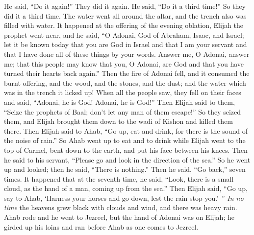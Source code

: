 \begin{biblechapter}
\verse He said, “Do it again!” They did it again. He said, “Do it a third time!” So they did it a third time.
\verse The water went all around the altar, and the trench also was filled with water.
\verse It happened at the offering of the evening oblation, Elijah the prophet went near, and he said, “O Adonai, God of Abraham, Isaac, and Israel; let it be known today that you are God in Israel and that I am your servant and that I have done all of these things by your words.
\verse Answer me, O Adonai, answer me; that this people may know that you, O Adonai, are God and that you have turned their hearts back again.”
\verse Then the fire of Adonai fell, and it consumed the burnt offering, and the wood, and the stones, and the dust; and the water which was in the trench it licked up!
\verse When all the people saw, they fell on their faces and said, “Adonai, he is God! Adonai, he is God!”
\verse Then Elijah said to them, “Seize the prophets of Baal; don’t let any man of them escape!” So they seized them, and Elijah brought them down to the wadi of Kishon and killed them there.
\verse Then Elijah said to Ahab, “Go up, eat and drink, for there is the sound of the noise of rain.”
\verse So Ahab went up to eat and to drink while Elijah went to the top of Carmel, bent down to the earth, and put his face between his knees.
\verse Then he said to his servant, “Please go and look in the direction of the sea.” So he went up and looked; then he said, “There is nothing.” Then he said, “Go back,” seven times.
\verse It happened that at the seventh time, he said, “Look, there is a small cloud, as the hand of a man, coming up from the sea.” Then Elijah said, “Go up, say to Ahab, ‘Harness your horses and go down, lest the rain stop you.’ ”
\verse \textit{In no time} the heavens grew black with clouds and wind, and there was heavy rain. Ahab rode and he went to Jezreel,
\verse but the hand of Adonai was on Elijah; he girded up his loins and ran before Ahab as one comes to Jezreel.
\end{biblechapter}

